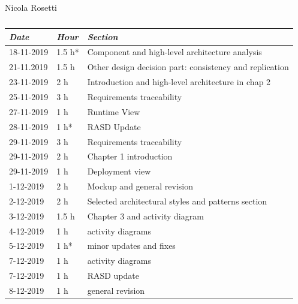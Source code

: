 \documentclass[a4paper]{report}
\begin{document}
\begin{table}[H]
\centering
Nicola Rosetti \\
\begin{tabular}{p{2cm}p{1.5cm}p{7cm}}
\toprule
\textit{Date} & \textit{Hour} & \textit{Section} \\ \midrule
18-11-2019 & 1.5 h* & Component and high-level architecture analysis \\ \midrule
21-11.2019 & 1.5 h & Other design decision part: consistency and replication \\ \midrule
23-11-2019 & 2 h & Introduction and high-level architecture in chap 2 \\ \midrule
25-11-2019 & 3 h & Requirements traceability \\ \midrule
27-11-2019 & 1 h & Runtime View \\ \midrule
28-11-2019 & 1 h* & RASD Update \\ \midrule
29-11-2019 & 3 h & Requirements traceability \\ \midrule
29-11-2019 & 2 h & Chapter 1 introduction \\ \midrule
29-11-2019 & 1 h & Deployment view \\ \midrule
1-12-2019 & 2 h & Mockup and general revision \\ \midrule
2-12-2019 & 2 h & Selected architectural styles and patterns section \\ \midrule
3-12-2019 & 1.5 h & Chapter 3 and activity diagram \\ \midrule
4-12-2019 & 1 h & activity diagrams \\ \midrule
5-12-2019 & 1 h* & minor updates and fixes\\ \midrule
7-12-2019 & 1 h & activity diagrams \\ \midrule
7-12-2019 & 1 h & RASD update\\ \midrule
8-12-2019 & 1 h & general revision\\ \midrule
\bottomrule
\end{tabular}
\caption[Nicola Rosetti's effort table]{}
\end{table}
\end{document}
